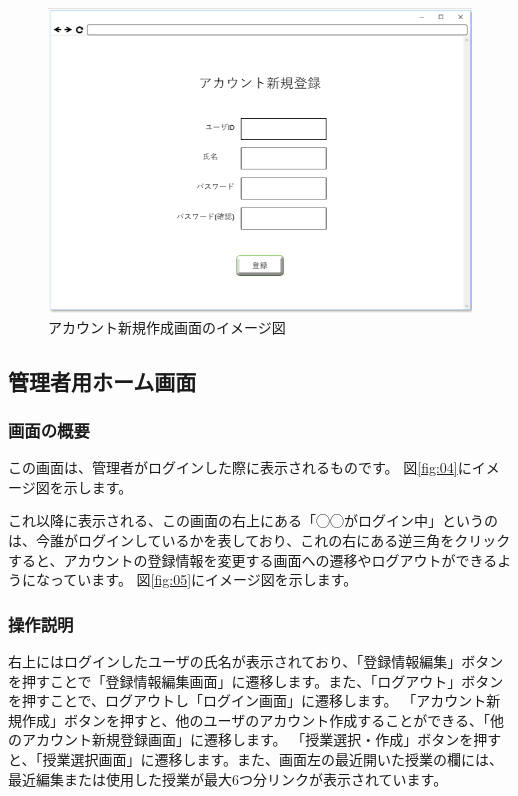 \begin{figure}[htbp]
  \begin{center}
    \includegraphics[width=1\linewidth,clip]{./img/03.png}
    \caption{アカウント新規作成画面のイメージ図}\label{fig:03}
  \end{center}
\end{figure}

\newpage

\subsection{管理者用ホーム画面}
\subsubsection{画面の概要}
この画面は、管理者がログインした際に表示されるものです。
図\ref{fig:04}にイメージ図を示します。

これ以降に表示される、この画面の右上にある「◯◯がログイン中」というのは、今誰がログインしているかを表しており、これの右にある逆三角をクリックすると、アカウントの登録情報を変更する画面への遷移やログアウトができるようになっています。
図\ref{fig:05}にイメージ図を示します。

\subsubsection{操作説明}
右上にはログインしたユーザの氏名が表示されており、「登録情報編集」ボタンを押すことで「登録情報編集画面」に遷移します。また、「ログアウト」ボタンを押すことで、ログアウトし「ログイン画面」に遷移します。
「アカウント新規作成」ボタンを押すと、他のユーザのアカウント作成することができる、「他のアカウント新規登録画面」に遷移します。
「授業選択・作成」ボタンを押すと、「授業選択画面」に遷移します。また、画面左の最近開いた授業の欄には、最近編集または使用した授業が最大6つ分リンクが表示されています。

